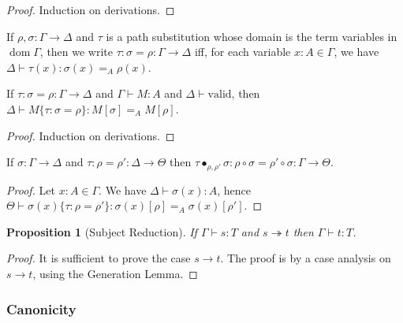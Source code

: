 \documentclass[a4paper,UKenglish]{lipics-v2016}
\newcommand*{\vald}{\ensuremath{\vdash \mathrm{valid}}}
\newcommand*{\dom}{\ensuremath{\operatorname{dom}}}
\theoremstyle{plain}
\newtheorem{proposition}[theorem]{Proposition}
\begin{document}
\begin{proof}
Induction on derivations.
\end{proof}

\begin{definition}
If $\rho, \sigma : \Gamma \rightarrow \Delta$ and $\tau$ is a path substitution whose domain
is the term variables in $\dom \Gamma$, then we write
$\tau : \sigma = \rho : \Gamma \rightarrow \Delta$ iff, for each variable $x : A \in \Gamma$, we have
$\Delta \vdash \tau(x) : \sigma(x) =_A \rho(x)$.
\end{definition}

\begin{lemma}
\label{lm:pathsub}
If $\tau : \sigma = \rho : \Gamma \rightarrow \Delta$ and $\Gamma \vdash M : A$ and $\Delta \vald$,
then $\Delta \vdash M \{ \tau : \sigma = \rho \} : M [ \sigma ] =_A M [ \rho ]$.
\end{lemma}

\begin{proof}
Induction on derivations.
\end{proof}

\begin{lemma}
\label{lm:pathsubcomp}
If $\sigma : \Gamma \rightarrow \Delta$ and $\tau : \rho = \rho' : \Delta \rightarrow \Theta$ then $\tau \bullet_{\rho, \rho'} \sigma : \rho \circ \sigma = \rho' \circ \sigma : \Gamma \rightarrow \Theta$.
\end{lemma}

\begin{proof}
Let $x : A \in \Gamma$.
We have $\Delta \vdash \sigma(x) : A$, hence $\Theta \vdash \sigma(x) \{ \tau : \rho = \rho' \} : \sigma(x) [ \rho ] =_A \sigma(x) [ \rho' ]$.
\end{proof}

\begin{proposition}[Subject Reduction]
If $\Gamma \vdash s : T$ and $s \twoheadrightarrow t$ then $\Gamma \vdash t : T$.
\end{proposition}

\begin{proof}
It is sufficient to prove the case $s \rightarrow t$.  The proof is by a case analysis on $s \rightarrow t$, using the Generation Lemma.
\end{proof}

\subsubsection{Canonicity}
\end{document}
